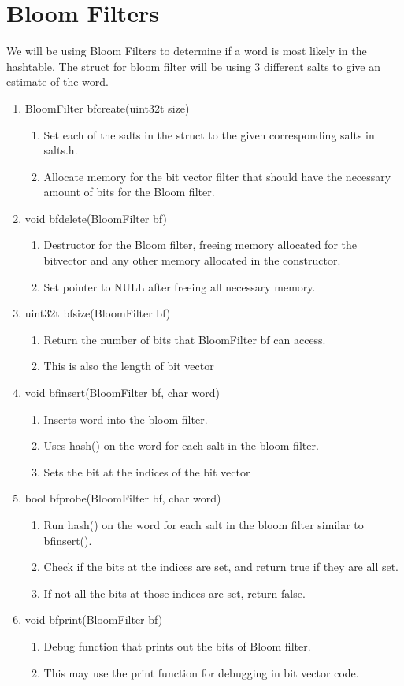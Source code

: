 \documentclass[11pt]{article}
\begin{document}
\section{Bloom Filters}\label{ss:bloom}
We will be using Bloom Filters to determine if a word is most likely in the hashtable. The struct for bloom filter will be using 3 different salts to give an estimate of the word.
\begin{enumerate}
\item BloomFilter bfcreate(uint32t size)
	\begin{enumerate}
	\item Set each of the salts in the struct to the given corresponding salts in salts.h.
	\item Allocate memory for the bit vector filter that should have the necessary amount of bits for the Bloom filter.
	\end{enumerate}
\item void bfdelete(BloomFilter bf)
	\begin{enumerate}
	\item Destructor for the Bloom filter, freeing memory allocated for the bitvector and any other memory allocated in the constructor.
	\item Set pointer to NULL after freeing all necessary memory.
	\end{enumerate}
\item uint32t bfsize(BloomFilter bf)
	\begin{enumerate}
	\item Return the number of bits that BloomFilter bf can access.
	\item This is also the length of bit vector
	\end{enumerate}
\item void bfinsert(BloomFilter bf, char word)
	\begin{enumerate}
	\item Inserts word into the bloom filter.
	\item Uses hash() on the word for each salt in the bloom filter. 
	\item Sets the bit at the indices of the bit vector
	\end{enumerate}
\item bool bfprobe(BloomFilter bf, char word)
	\begin{enumerate}
	\item Run hash() on the word for each salt in the bloom filter similar to bfinsert().
	\item Check if the bits at the indices are set, and return true if they are all set.
	\item If not all the bits at those indices are set, return false.
	\end{enumerate}
\item void bfprint(BloomFilter bf)
	\begin{enumerate}
	\item Debug function that prints out the bits of Bloom filter.
	\item This may use the print function for debugging in bit vector code.
	\end{enumerate}
\end{enumerate}
\end{document}
